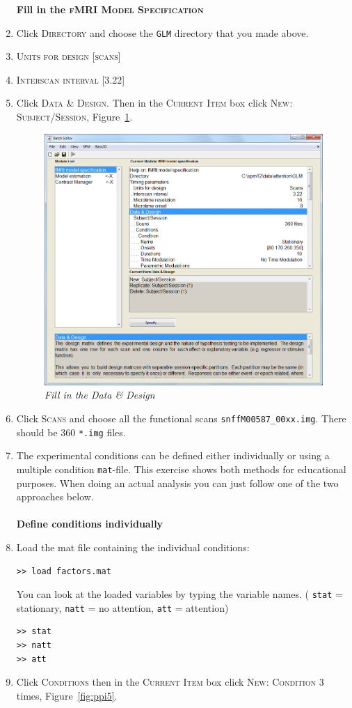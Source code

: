 \begin{enumerate}
\textbf{Fill in the \textsc{fMRI Model Specification}}

\item Click \textsc{Directory} and choose the \texttt{GLM} directory that you made above.
\item \textsc{Units for design} [\textsc{scans}]
\item \textsc{Interscan interval} [3.22]
\item Click \textsc{Data \& Design}. Then in the \textsc{Current Item} box click \textsc{New: Subject/Session}, Figure~\ref{fig:ppi4}.

\begin{figure}[!ht]
\centering\includegraphics[width=120mm]{ppi/figures/Fig4.png}
\caption{\em Fill in the Data \& Design}
\label{fig:ppi4}
\end{figure}

\item Click \textsc{Scans} and choose all the functional scans \texttt{snffM00587\_00xx.img}. There should be 360 \texttt{*.img} files.
\item The experimental conditions can be defined either individually or using a multiple condition \texttt{mat}-file. This exercise shows both methods for educational purposes. When doing an actual analysis you can just follow one of the two approaches below.\\\\

\textbf{Define conditions individually}
\item Load the mat file containing the individual conditions:
\begin{verbatim}
>> load factors.mat
\end{verbatim}
You can look at the loaded variables by typing the variable names.
( \texttt{stat} = stationary, \texttt{natt} = no attention, \texttt{att} = attention)
\begin{verbatim}
>> stat
>> natt
>> att
\end{verbatim}
\item Click \textsc{Conditions} then in the \textsc{Current Item} box click \textsc{New: Condition} 3 times, Figure~\ref{fig:ppi5}.


\end{enumerate}
